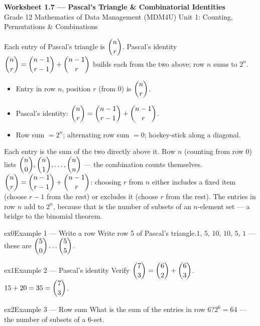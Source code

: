 \documentclass[11pt]{article}
\begin{document}
\begin{center}
{\LARGE\bfseries\color{titleblue}Worksheet 1.7 --- Pascal's Triangle \& Combinatorial Identities}\\[2pt]
{\small Grade 12 Mathematics of Data Management (MDM4U) \textperiodcentered{} Unit 1: Counting, Permutations \& Combinations}
\end{center}

\begin{ideabox}
Each entry of Pascal's triangle is $\dbinom{n}{r}$. Pascal's identity $\dbinom{n}{r}=\dbinom{n-1}{r-1}+\dbinom{n-1}{r}$ builds each from the two above; row $n$ sums to $2^n$.
\begin{itemize}[leftmargin=*,itemsep=2pt]
  \item Entry in row $n$, position $r$ (from 0) is $\dbinom{n}{r}$.
  \item Pascal's identity: $\dbinom{n}{r}=\dbinom{n-1}{r-1}+\dbinom{n-1}{r}$.
  \item Row sum $=2^n$; alternating row sum $=0$; hockey-stick along a diagonal.
\end{itemize}
\end{ideabox}

\begin{learnbox}
Each entry is the sum of the two directly above it. Row $n$ (counting from row 0) lists $\dbinom{n}{0},\dbinom{n}{1},\dots,\dbinom{n}{n}$ — the combination counts themselves.
$\dbinom{n}{r}=\dbinom{n-1}{r-1}+\dbinom{n-1}{r}$: choosing $r$ from $n$ either includes a fixed item (choose $r-1$ from the rest) or excludes it (choose $r$ from the rest).
The entries in row $n$ add to $2^n$, because that is the number of subsets of an $n$-element set — a bridge to the binomial theorem.
\end{learnbox}


\begin{example}{ex0}{Example 1 --- Write a row}
Write row 5 of Pascal's triangle.\soln $1,\,5,\,10,\,10,\,5,\,1$ --- these are $\dbinom{5}{0}\dots\dbinom{5}{5}$.
\end{example}

\begin{example}{ex1}{Example 2 --- Pascal's identity}
Verify $\dbinom{7}{3}=\dbinom{6}{2}+\dbinom{6}{3}$.\soln $15+20=35=\dbinom{7}{3}$.
\end{example}

\begin{example}{ex2}{Example 3 --- Row sum}
What is the sum of the entries in row 6?\soln $2^6=64$ --- the number of subsets of a 6-set.
\end{example}
\end{document}
